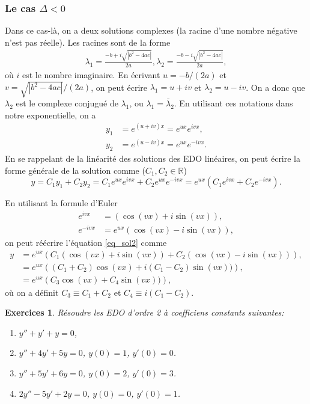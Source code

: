 \documentclass[a4paper,12pt]{book}
\newcommand{\real}{\mathbb{R}}
\renewcommand{\eqref}[1]{\ref{#1}}
\newtheorem*{exercices}{Exercices}
\begin{document}
\subsubsection{Le cas $\Delta<0$}
Dans ce cas-là, on a deux solutions complexes (la racine d'une nombre négative 
n'est pas réelle). Les racines sont de la forme
\begin{align}
 \lambda_1=\frac{-b+i\sqrt{|b^2-4ac|}}{2a},
 \lambda_2=\frac{-b-i\sqrt{|b^2-4ac|}}{2a},
\end{align}
où $i$ est le nombre imaginaire. En écrivant $u=-b/(2a)$ et $v=\sqrt{|b^2-4ac|}/(2a)$, on peut écrire $\lambda_1=u+iv$ et $\lambda_2=u-iv$. On a donc que 
$\lambda_2$ est le complexe conjugué de $\lambda_1$, ou $\lambda_1=\bar{\lambda}_2$. En utilisant ces notations dans 
notre exponentielle, on a 
\begin{align}
 y_1&=e^{(u+iv)x}=e^{ux}e^{ivx},\\
 y_2&=e^{(u-iv)x}=e^{ux}e^{-ivx}.
\end{align}
En se rappelant de la linéarité des solutions des EDO linéaires, 
on peut écrire la forme générale de la solution comme ($C_1,C_2\in \real$)
\begin{equation}
 y=C_1y_1+C_2y_2=C_1e^{ux}e^{ivx}+C_2e^{ux}e^{-ivx}=e^{ux}(C_1e^{ivx}+C_2e^{-ivx}).\label{eq_sol2}
\end{equation}

En utilisant la formule d'Euler
\begin{align}
 e^{ivx}&=(\cos(vx)+i\sin(vx)),\\
 e^{-ivx}&=e^{ux}(\cos(vx)-i\sin(vx)),
\end{align}
on peut réécrire l'équation \eqref{eq_sol2} comme
\begin{align}
 y&=e^{ux}\left(C_1(\cos(vx)+i\sin(vx))+C_2(\cos(vx)-i\sin(vx))\right),\nonumber\\
 &=e^{ux}\left((C_1+C_2)\cos(vx)+i(C_1-C_2)\sin(vx))\right),\nonumber\\
 &=e^{ux}\left(C_3\cos(vx)+C_4\sin(vx))\right),
\end{align}
où on a définit $C_3\equiv C_1+C_2$ et $C_4\equiv i(C_1-C_2)$.

\begin{exercices}
Résoudre les EDO d'ordre 2 à coefficiens constants suivantes:
 \begin{enumerate}
  \item $y''+y'+y=0$,
  \item $y''+4y'+5y=0$, $y(0)=1$, $y'(0)=0$.
  \item $y''+5y'+6y=0$, $y(0)=2$, $y'(0)=3$.
  \item $2y''-5y'+2y=0$, $y(0)=0$, $y'(0)=1$.
 \end{enumerate}

\end{exercices}
\end{document}
